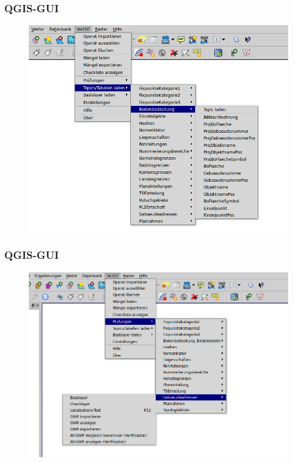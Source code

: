 \documentclass{beamer}
\begin{document}
\begin{frame}
  \frametitle{QGIS-GUI}
  \begin{figure}
    \includegraphics[scale=0.35]{bilder/veriso_topic_loader_3.png}
  \end{figure}
\end{frame}

\begin{frame}
  \frametitle{QGIS-GUI}
  \begin{figure}
    \includegraphics[scale=0.35]{bilder/veriso_checks_3.png}
  \end{figure}
\end{frame}
\end{document}
